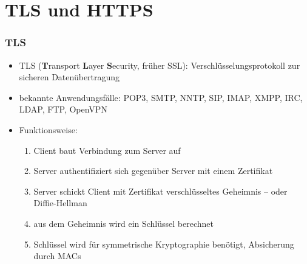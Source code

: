 \documentclass[10pt,compress]{beamer}
\begin{document}
\section{TLS und HTTPS}
\frame
{
    \frametitle{TLS}

    \begin{itemize}
        \item TLS (\textbf{T}ransport \textbf{L}ayer \textbf{S}ecurity, früher SSL): Verschlüsselungsprotokoll zur sicheren Datenübertragung
        \item bekannte Anwendungsfälle: POP3, SMTP, NNTP, SIP, IMAP, XMPP, IRC, LDAP, FTP, OpenVPN
        \item Funktionsweise:
        \begin{enumerate}
            \item Client baut Verbindung zum Server auf
            \item Server authentifiziert sich gegenüber Server mit einem Zertifikat
            \item Server schickt Client mit Zertifikat verschlüsseltes Geheimnis -- oder Diffie-Hellman
            \item aus dem Geheimnis wird ein Schlüssel berechnet
            \item Schlüssel wird für symmetrische Kryptographie benötigt, Absicherung durch MACs
        \end{enumerate}
    \end{itemize}
}

\end{document}
